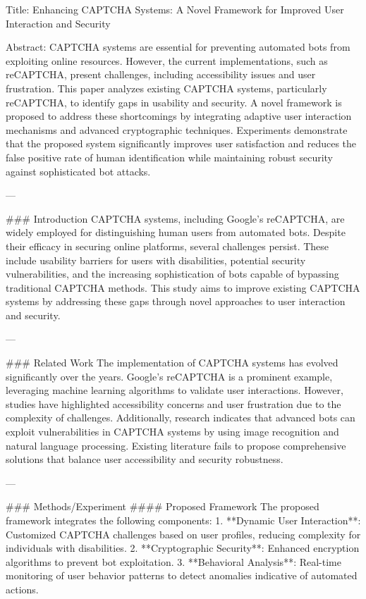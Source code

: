 Title: Enhancing CAPTCHA Systems: A Novel Framework for Improved User Interaction and Security

Abstract:  
CAPTCHA systems are essential for preventing automated bots from exploiting online resources. However, the current implementations, such as reCAPTCHA, present challenges, including accessibility issues and user frustration. This paper analyzes existing CAPTCHA systems, particularly reCAPTCHA, to identify gaps in usability and security. A novel framework is proposed to address these shortcomings by integrating adaptive user interaction mechanisms and advanced cryptographic techniques. Experiments demonstrate that the proposed system significantly improves user satisfaction and reduces the false positive rate of human identification while maintaining robust security against sophisticated bot attacks.

---

### Introduction  
CAPTCHA systems, including Google's reCAPTCHA, are widely employed for distinguishing human users from automated bots. Despite their efficacy in securing online platforms, several challenges persist. These include usability barriers for users with disabilities, potential security vulnerabilities, and the increasing sophistication of bots capable of bypassing traditional CAPTCHA methods. This study aims to improve existing CAPTCHA systems by addressing these gaps through novel approaches to user interaction and security.

---

### Related Work  
The implementation of CAPTCHA systems has evolved significantly over the years. Google's reCAPTCHA is a prominent example, leveraging machine learning algorithms to validate user interactions. However, studies have highlighted accessibility concerns and user frustration due to the complexity of challenges. Additionally, research indicates that advanced bots can exploit vulnerabilities in CAPTCHA systems by using image recognition and natural language processing. Existing literature fails to propose comprehensive solutions that balance user accessibility and security robustness.

---

### Methods/Experiment  
#### Proposed Framework  
The proposed framework integrates the following components:  
1. **Dynamic User Interaction**: Customized CAPTCHA challenges based on user profiles, reducing complexity for individuals with disabilities.  
2. **Cryptographic Security**: Enhanced encryption algorithms to prevent bot exploitation.  
3. **Behavioral Analysis**: Real-time monitoring of user behavior patterns to detect anomalies indicative of automated actions.

